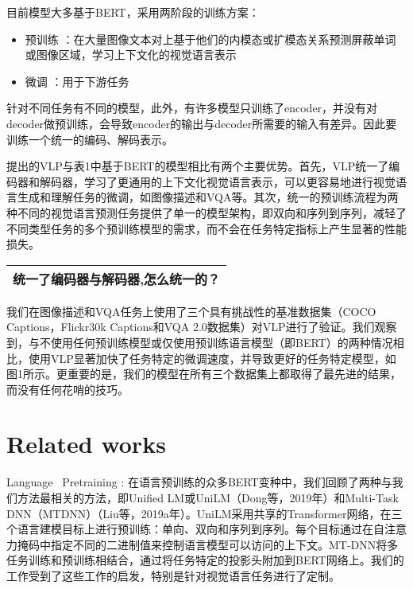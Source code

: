 \documentclass{article}
\begin{document}
\begin{sloppypar}
\begin{itemize}
      \end{itemize}



      目前模型大多基于BERT，采用两阶段的训练方案：
      \begin{itemize}
            \item 预训练 ：在大量图像文本对上基于他们的内模态或扩模态关系预测屏蔽单词或图像区域，学习上下文化的视觉语言表示
            \item 微调   ：用于下游任务
      \end{itemize}


      针对不同任务有不同的模型，此外，有许多模型只训练了encoder，并没有对decoder做预训练，会导致encoder的输出与decoder所需要的输入有差异。因此要训练一个统一的编码、解码表示。


      提出的VLP与表1中基于BERT的模型相比有两个主要优势。首先，VLP统一了编码器和解码器，学习了更通用的上下文化视觉语言表示，可以更容易地进行视觉语言生成和理解任务的微调，如图像描述和VQA等。其次，统一的预训练流程为两种不同的视觉语言预测任务提供了单一的模型架构，即双向和序列到序列，减轻了不同类型任务的多个预训练模型的需求，而不会在任务特定指标上产生显著的性能损失。
      \begin{table*}[!htbp]
            \renewcommand\arraystretch{2}

            \centering
            \begin{tabularx}{\textwidth}{|X|}
                  \hline
                  统一了编码器与解码器,怎么统一的？ \\
                  \hline
            \end{tabularx}%

      \end{table*}%

      我们在图像描述和VQA任务上使用了三个具有挑战性的基准数据集（COCO Captions，Flickr30k Captions和VQA 2.0数据集）对VLP进行了验证。我们观察到，与不使用任何预训练模型或仅使用预训练语言模型（即BERT）的两种情况相比，使用VLP显著加快了任务特定的微调速度，并导致更好的任务特定模型，如图1所示。更重要的是，我们的模型在所有三个数据集上都取得了最先进的结果，而没有任何花哨的技巧。


      \section{Related works}

      Language  Pretraining : 在语言预训练的众多BERT变种中，我们回顾了两种与我们方法最相关的方法，即Unified LM或UniLM（Dong等，2019年）和Multi-Task DNN（MTDNN）（Liu等，2019a年）。UniLM采用共享的Transformer网络，在三个语言建模目标上进行预训练：单向、双向和序列到序列。每个目标通过在自注意力掩码中指定不同的二进制值来控制语言模型可以访问的上下文。MT-DNN将多任务训练和预训练相结合，通过将任务特定的投影头附加到BERT网络上。我们的工作受到了这些工作的启发，特别是针对视觉语言任务进行了定制。
      \begin{table*}[!htbp]
            \renewcommand\arraystretch{2}


\end{table*}
\end{sloppypar}
\end{document}
